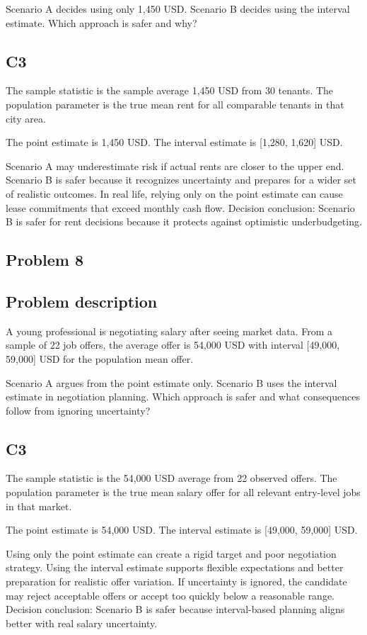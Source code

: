 \begin{ExamProblems}
		Scenario A decides using only 1,450 USD.
		Scenario B decides using the interval estimate.
		Which approach is safer and why?

		\subsection*{C3}
		The sample statistic is the sample average 1,450 USD from 30 tenants.
		The population parameter is the true mean rent for all comparable tenants in that city area.

		The point estimate is 1,450 USD.
		The interval estimate is [1,280, 1,620] USD.

		Scenario A may underestimate risk if actual rents are closer to the upper end.
		Scenario B is safer because it recognizes uncertainty and prepares for a wider set of realistic outcomes.
		In real life, relying only on the point estimate can cause lease commitments that exceed monthly cash flow.
		Decision conclusion: Scenario B is safer for rent decisions because it protects against optimistic underbudgeting.

		\newpage
		\item
		\subsection*{Problem 8}
		\subsection*{Problem description}
		A young professional is negotiating salary after seeing market data.
		From a sample of 22 job offers, the average offer is 54,000 USD with interval [49,000, 59,000] USD for the population mean offer.

		Scenario A argues from the point estimate only.
		Scenario B uses the interval estimate in negotiation planning.
		Which approach is safer and what consequences follow from ignoring uncertainty?

		\subsection*{C3}
		The sample statistic is the 54,000 USD average from 22 observed offers.
		The population parameter is the true mean salary offer for all relevant entry-level jobs in that market.

		The point estimate is 54,000 USD.
		The interval estimate is [49,000, 59,000] USD.

		Using only the point estimate can create a rigid target and poor negotiation strategy.
		Using the interval estimate supports flexible expectations and better preparation for realistic offer variation.
		If uncertainty is ignored, the candidate may reject acceptable offers or accept too quickly below a reasonable range.
		Decision conclusion: Scenario B is safer because interval-based planning aligns better with real salary uncertainty.


\end{ExamProblems}
